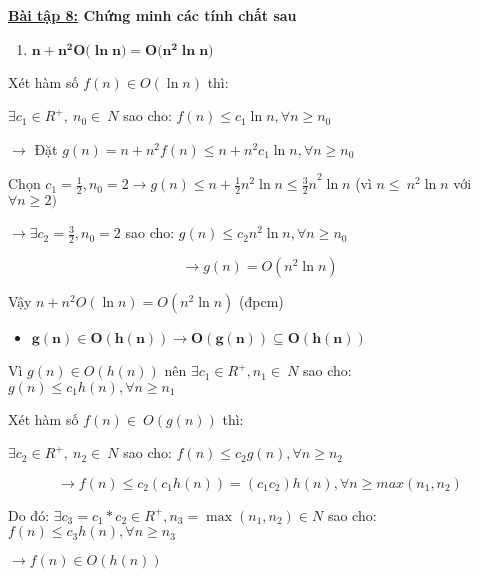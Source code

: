\documentclass[
]{article}
\author{}
\date{}
\begin{document}
\textbf{\uline{Bài tập 8:} Chứng minh các tính chất sau}

\begin{enumerate}
\item
  \(\mathbf{n +}\mathbf{n}^{\mathbf{2}}\mathbf{O(}\mathbf{\ln}\mathbf{n}\mathbf{) = O(}\mathbf{n}^{\mathbf{2}}\mathbf{\ln}\mathbf{n}\mathbf{)}\)
\end{enumerate}

Xét hàm số \(f(n) \in O\left( \ln n \right)\) thì:

\(\exists c_{1} \in R^{+},\ n_{0} \in \ N\) sao cho:
\(f(n) \leq c_{1}\ln n,\forall n \geq n_{0}\)

\(\rightarrow\) Đặt
\(g(n) = n + n^{2}f(n) \leq n + n^{2}c_{1}\ln n,\forall n \geq n_{0}\ \)

Chọn
\(c_{1} = \frac{1}{2},n_{0} = 2 \rightarrow g(n) \leq n + \frac{1}{2}n^{2}\ln{n \leq {\frac{3}{2}n}^{2}\ln n}\)
(vì \(n \leq \ n^{2}\ln n\) với \(\forall n \geq 2)\)

\(\rightarrow \exists c_{2} = \frac{3}{2},n_{0} = 2\) sao cho:
\(g(n) \leq c_{2}n^{2}\ln n,\forall n \geq n_{0}\)

\[\rightarrow g(n) = O\left( n^{2}\ln n \right)\]

Vậy \(n + n^{2}O\left( \ln n \right) = O\left( n^{2}\ln n \right)\)
(đpcm)

\begin{itemize}
\item
  \(\mathbf{g}\left( \mathbf{n} \right)\mathbf{\in O}\left( \mathbf{h}\left( \mathbf{n} \right) \right)\mathbf{\rightarrow O}\left( \mathbf{g}\left( \mathbf{n} \right) \right)\mathbf{\subseteq O}\left( \mathbf{h}\left( \mathbf{n} \right) \right)\)
\end{itemize}

Vì \(g(n) \in O\left( h(n) \right)\) nên
\(\exists c_{1} \in R^{+},n_{1} \in \ N\) sao cho:
\(g(n) \leq c_{1}h(n),\forall n \geq n_{1}\)

Xét hàm số \(f(n) \in \ O(g(n))\) thì:

\(\exists c_{2} \in R^{+},\ n_{2} \in \ N\) sao cho:
\(f(n) \leq c_{2}g(n),\forall n \geq n_{2}\)

\[\rightarrow f(n) \leq c_{2}\left( c_{1}h(n) \right) = \left( c_{1}c_{2} \right)h(n),\forall n \geq max(n_{1},n_{2})\]

Do đó:
\(\exists c_{3} = c_{1}*c_{2} \in R^{+},n_{3} = \max\left( n_{1},n_{2} \right) \in N\)
sao cho: \(f(n) \leq c_{3}h(n),\forall n \geq n_{3}\)

\(\rightarrow f(n) \in O\left( h(n) \right)\)
\end{document}

